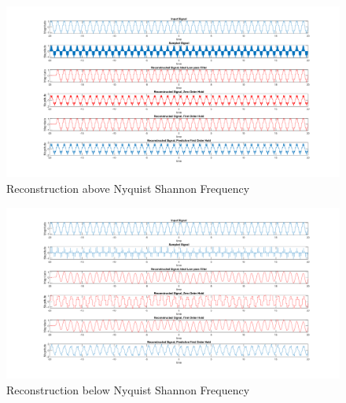 \documentclass{article}
\begin{document}
\begin{figure}[htbp]
    \begin{center}
	\includegraphics[width=150mm]{figures/Complete_0.017.png}
    \end{center}
    \caption{Reconstruction above Nyquist Shannon Frequency}
\end{figure}

\begin{figure}[htbp]
    \begin{center}
	\includegraphics[width=150mm]{figures/Complete_0.17.png}
    \end{center}
    \caption{Reconstruction below Nyquist Shannon Frequency}
\end{figure}
    
\end{document}
